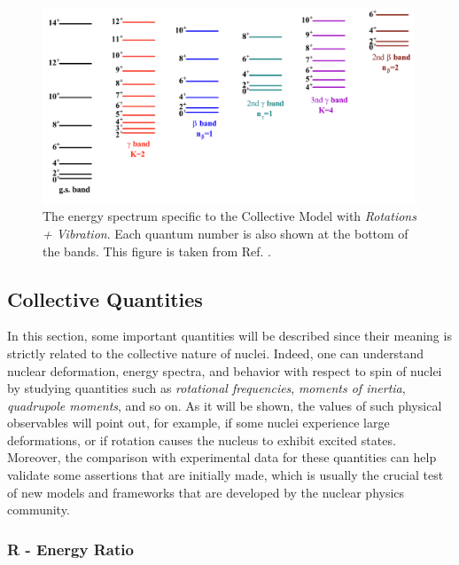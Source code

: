\begin{figure}
    \centering
    \includegraphics[width=0.99\textwidth]{Chapters/Figures/types_collective_bands.pdf}
    \caption{The energy spectrum specific to the Collective Model with \emph{Rotations + Vibration}. Each quantum number is also shown at the bottom of the bands. This figure is taken from Ref. \cite{li2022model}.}
    \label{collective-rotation-vibration-energy-levels}
\end{figure}

\subsection{Collective Quantities}

In this section, some important quantities will be described since their meaning is strictly related to the collective nature of nuclei. Indeed, one can understand nuclear deformation, energy spectra, and behavior with respect to spin of nuclei by studying quantities such as \emph{rotational frequencies}, \emph{moments of inertia}, \emph{quadrupole moments}, and so on. As it will be shown, the values of such physical observables will point out, for example, if some nuclei experience large deformations, or if rotation causes the nucleus to exhibit excited states. Moreover, the comparison with experimental data for these quantities can help validate some assertions that are initially made, which is usually the crucial test of new models and frameworks that are developed by the nuclear physics community.

\subsubsection{R - Energy Ratio}

